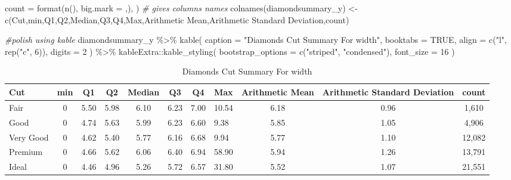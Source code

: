 \documentclass[
]{article}
\newenvironment{Shaded}{\begin{snugshade}}{\end{snugshade}}
\newcommand{\AttributeTok}[1]{\textcolor[rgb]{0.77,0.63,0.00}{#1}}
\newcommand{\CommentTok}[1]{\textcolor[rgb]{0.56,0.35,0.01}{\textit{#1}}}
\newcommand{\ConstantTok}[1]{\textcolor[rgb]{0.00,0.00,0.00}{#1}}
\newcommand{\DecValTok}[1]{\textcolor[rgb]{0.00,0.00,0.81}{#1}}
\newcommand{\FunctionTok}[1]{\textcolor[rgb]{0.00,0.00,0.00}{#1}}
\newcommand{\NormalTok}[1]{#1}
\newcommand{\OtherTok}[1]{\textcolor[rgb]{0.56,0.35,0.01}{#1}}
\newcommand{\SpecialCharTok}[1]{\textcolor[rgb]{0.00,0.00,0.00}{#1}}
\newcommand{\StringTok}[1]{\textcolor[rgb]{0.31,0.60,0.02}{#1}}
\begin{document}
\begin{Shaded}
\begin{Highlighting}[]
    \AttributeTok{count =} \FunctionTok{format}\NormalTok{(}\FunctionTok{n}\NormalTok{(), }\AttributeTok{big.mark =} \StringTok{\textquotesingle{},\textquotesingle{}}\NormalTok{),}
\NormalTok{  )}
\CommentTok{\# gives columns names }
\FunctionTok{colnames}\NormalTok{(diamondsummary\_y) }\OtherTok{\textless{}{-}} \FunctionTok{c}\NormalTok{(}\StringTok{\textquotesingle{}Cut\textquotesingle{}}\NormalTok{,}\StringTok{\textquotesingle{}min\textquotesingle{}}\NormalTok{,}\StringTok{\textquotesingle{}Q1\textquotesingle{}}\NormalTok{,}\StringTok{\textquotesingle{}Q2\textquotesingle{}}\NormalTok{,}\StringTok{\textquotesingle{}Median\textquotesingle{}}\NormalTok{,}\StringTok{\textquotesingle{}Q3\textquotesingle{}}\NormalTok{,}\StringTok{\textquotesingle{}Q4\textquotesingle{}}\NormalTok{,}\StringTok{\textquotesingle{}Max\textquotesingle{}}\NormalTok{,}\StringTok{\textquotesingle{}Arithmetic Mean\textquotesingle{}}\NormalTok{,}\StringTok{\textquotesingle{}Arithmetic Standard Deviation\textquotesingle{}}\NormalTok{,}\StringTok{\textquotesingle{}count\textquotesingle{}}\NormalTok{)}

\CommentTok{\#polish using kable}
\NormalTok{diamondsummary\_y }\SpecialCharTok{\%\textgreater{}\%}
  \FunctionTok{kable}\NormalTok{(}
    \AttributeTok{caption =} \StringTok{"Diamonds Cut Summary For width"}\NormalTok{,}
    \AttributeTok{booktabs =} \ConstantTok{TRUE}\NormalTok{,}
    \AttributeTok{align =} \FunctionTok{c}\NormalTok{(}\StringTok{"l"}\NormalTok{, }\FunctionTok{rep}\NormalTok{(}\StringTok{"c"}\NormalTok{, }\DecValTok{6}\NormalTok{)),}
    \AttributeTok{digits =} \DecValTok{2}
\NormalTok{  ) }\SpecialCharTok{\%\textgreater{}\%}
\NormalTok{  kableExtra}\SpecialCharTok{::}\FunctionTok{kable\_styling}\NormalTok{(}
    \AttributeTok{bootstrap\_options =} \FunctionTok{c}\NormalTok{(}\StringTok{"striped"}\NormalTok{, }\StringTok{"condensed"}\NormalTok{),}
    \AttributeTok{font\_size =} \DecValTok{16}
\NormalTok{  )}
\end{Highlighting}
\end{Shaded}

\begin{table}

\caption{\label{tab:Diamonds Summary}Diamonds Cut Summary For width}
\centering
\fontsize{16}{18}\selectfont
\begin{tabular}[t]{lcccccclccc}
\toprule
Cut & min & Q1 & Q2 & Median & Q3 & Q4 & Max & Arithmetic Mean & Arithmetic Standard Deviation & count\\
\midrule
Fair & 0 & 5.50 & 5.98 & 6.10 & 6.23 & 7.00 & 10.54 & 6.18 & 0.96 & 1,610\\
Good & 0 & 4.74 & 5.63 & 5.99 & 6.23 & 6.60 & 9.38 & 5.85 & 1.05 & 4,906\\
Very Good & 0 & 4.62 & 5.40 & 5.77 & 6.16 & 6.68 & 9.94 & 5.77 & 1.10 & 12,082\\
Premium & 0 & 4.66 & 5.62 & 6.06 & 6.40 & 6.94 & 58.90 & 5.94 & 1.26 & 13,791\\
Ideal & 0 & 4.46 & 4.96 & 5.26 & 5.72 & 6.57 & 31.80 & 5.52 & 1.07 & 21,551\\
\bottomrule
\end{tabular}
\end{table}
\end{document}
